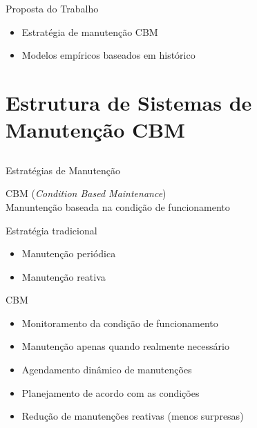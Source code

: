 \documentclass{beamer}
\begin{document}
\begin{frame}{Proposta do Trabalho}

    \begin{itemize}
        \item Estratégia de manutenção \alert{CBM}
        \item Modelos empíricos baseados em \alert{histórico}
    \end{itemize}
    
\end{frame}

\section{Estrutura de Sistemas de Manutenção CBM}
\subsection{}

\begin{frame}{Estratégias de Manutenção}

        CBM (\textit{Condition Based Maintenance})\\
            Manuntenção baseada na condição de funcionamento

    \begin{block}{Estratégia tradicional}
        \begin{itemize}
            \item Manutenção periódica
            \item Manutenção reativa
        \end{itemize}
    \end{block}

    \begin{block}{CBM}
        \begin{itemize}
            \item Monitoramento da condição de funcionamento
            \item Manutenção apenas quando realmente necessário
            \item Agendamento dinâmico de manutenções
            \item Planejamento de acordo com as condições
            \item Redução de manutenções reativas (menos surpresas)
        \end{itemize}
    \end{block}
    
\end{frame}
\end{document}
